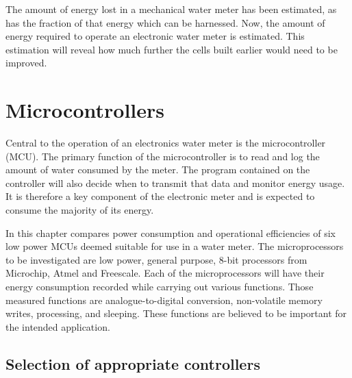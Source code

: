 
The amount of energy lost in a mechanical water meter has been estimated, as has the fraction of that energy which can be harnessed.
Now, the amount of energy required to operate an electronic water meter is estimated.
This estimation will reveal how much further the cells built earlier would need to be improved.

\section{Microcontrollers}

  Central to the operation of an electronics water meter is the microcontroller (MCU).
  The primary function of the microcontroller is to read and log the amount of water consumed by the meter.
  The program contained on the controller will also decide when to transmit that data and monitor energy usage.
  It is therefore a key component of the electronic meter and is expected to consume the majority of its energy.

  In this chapter compares power consumption and operational efficiencies of six low power MCUs deemed suitable for use in a water meter.
  The microprocessors to be investigated are low power, general purpose, 8-bit processors from Microchip, Atmel and Freescale.
  Each of the microprocessors will have their energy consumption recorded while carrying out various functions.
  Those measured functions are analogue-to-digital conversion, non-volatile memory writes, processing, and sleeping.
  These functions are believed to be important for the intended application.


  \subsection{Selection of appropriate controllers}

